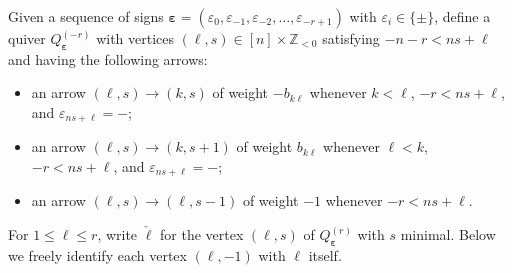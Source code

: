 \documentclass{amsart}
\numberwithin{theorem}{section}
\newcommand{\ZZ}{\mathbb{Z}}
\newcommand{\beps}{{\boldsymbol{\varepsilon}}}
\begin{document}
  Given a sequence of signs $\beps=(\varepsilon_0,\varepsilon_{-1},\varepsilon_{-2},\ldots,\varepsilon_{-r+1})$ with $\varepsilon_i\in\{\pm\}$, define a quiver $Q^{(-r)}_\beps$ with vertices $(\ell,s)\in [n]\times\ZZ_{<0}$ satisfying $-n-r<ns+\ell$ and having the following arrows:
  \begin{itemize}
    \item an arrow $(\ell,s)\to (k,s)$ of weight $-b_{k\ell}$ whenever $k<\ell$, $-r<ns+\ell$, and $\varepsilon_{ns+\ell}=-$;
    \item an arrow $(\ell,s)\to (k,s+1)$ of weight $b_{k\ell}$ whenever $\ell<k$, $-r<ns+\ell$, and $\varepsilon_{ns+\ell}=-$;
    \item an arrow $(\ell,s)\to (\ell,s-1)$ of weight $-1$ whenever $-r<ns+\ell$.
  \end{itemize}
  For $1\le\ell\le r$, write $\check{\ell}$ for the vertex $(\ell,s)$ of $Q^{(r)}_\beps$ with $s$ minimal.
  Below we freely identify each vertex $(\ell,-1)$ with $\ell$ itself.
\end{document}
